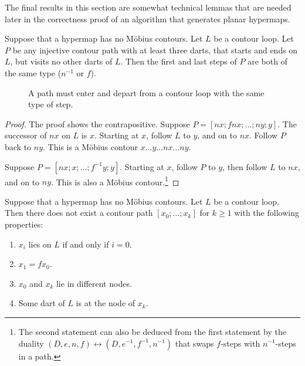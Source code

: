 The final results in this section are somewhat  technical lemmas that are
needed later in the correctness proof of an algorithm that generates planar hypermaps.

\begin{lemma}\label{lemma:contour-path-type}
Suppose that a hypermap has no M\"obius contours. Let $L$ be a
contour loop.  Let $P$ be any injective contour path with at least
three darts, that starts and ends on $L$, but visits no other darts of
$L$.  Then the first and last steps of $P$ are both of the same type
($n^{-1}$ or $f$).
\end{lemma}
%

\begin{figure}[htb]
\centering
{}
\caption{A path must enter and depart from a contour loop with the
same type of step.}
\label{fig:interior_nf}
\end{figure}


\begin{proof} The proof shows the contrapositive.  Suppose $P=[n x;f n
x;\ldots;n y;y]$.  The successor of $n x$ on $L$ is $x$.  Starting
at $x$, follow $L$ to $y$, and on to $n x$.  Follow $P$ back to $n
y$.
This is a M\"obius contour $x\ldots y\ldots n x\ldots n y$.

Suppose $P=[n x;x;\ldots;f^{-1} y;y]$.  Starting at $x$, follow $P$ to
$y$, then follow $L$ to $n x$, and on to $n y$.  This is also a M\"obius
contour.\footnote{The second statement can also be deduced from the first statement
by the duality $(D,e,n,f)\leftrightarrow (D,e^{-1},f^{-1},n^{-1})$ that swaps
$f$-steps with $n^{-1}$-steps in a path.}
\end{proof}



\begin{lemma}\label{lemma:contour-f}
Suppose that a hypermap has no M\"obius contours.  Let $L$ be a
contour loop.  Then there does not exist a contour path
$[x_0;\ldots;x_k]$ for $k\ge 1$ with the following properties:
\begin{enumerate}
\item $x_i$ lies on $L$ if and only if $i=0$.
\item $x_1 = f x_0$.
\item $x_0$ and $x_k$ lie in different nodes.
\item Some dart of $L$ is at the node of $x_k$.
\end{enumerate}
\end{lemma}

